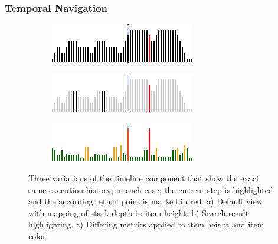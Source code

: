 \subsubsection{Temporal Navigation}
\begin{figure}[tb]
	\centering
	
	\begin{subfigure}[b]{0.45\textwidth}
		\centering
        \includegraphics[width=\textwidth]{../images/04-ImplTimeline1}
        \caption[Default View]{}
		\label{fig:ApproachTimelineDefault}
	\end{subfigure}
	\quad
	\begin{subfigure}[b]{0.45\textwidth}
		\centering
		\includegraphics[width=\textwidth]{../images/04-ImplTimeline2}
		\caption[Search Result Highlighting]{}
		\label{fig:ApproachTimelineSearch}
	\end{subfigure}
	\quad
	\begin{subfigure}[b]{0.45\textwidth}
		\centering
		\includegraphics[width=\textwidth]{../images/04-ImplTimeline3}
		\caption[Differing Metrics Applied to Item Height and Color]{}
		\label{fig:ApproachTimelineMetrics}
	\end{subfigure}
	
	\caption[Variations of the Timeline Component]{Three variations of the timeline component that show the exact same execution history; in each case, the current step is highlighted and the according return point is marked in red.
		a) Default view with mapping of stack depth to item height.
		b) Search result highlighting.
		c) Differing metrics applied to item height and item color.
	}
	\label{fig:ApproachTimeline}
\end{figure}

